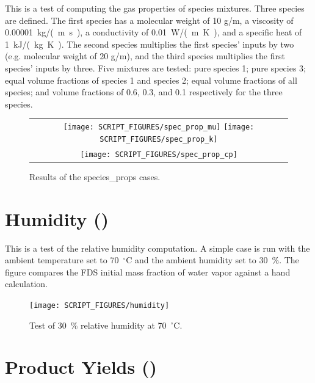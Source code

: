 \documentclass[11pt]{book}
\begin{document}
This is a test of computing the gas properties of species mixtures. Three species are defined. The first species has a molecular weight of 10 g/m, a viscosity of 0.00001~\si{kg/(m.s)},
a conductivity of 0.01~\si{W/(m.K)}, and a specific heat of 1~\si{kJ/(kg.K)}. The second species multiplies the first species' inputs by two (e.g. molecular weight of 20 g/m), and the third species multiplies the first species' inputs by three. Five mixtures are tested: pure species 1; pure species 3; equal volume fractions of species 1 and species 2; equal volume fractions of all species; and volume fractions of 0.6, 0.3, and 0.1 respectively for the three species.

\begin{figure}[ht]
    \centering
    \begin{tabular}{c}
      \texttt{[image: SCRIPT\_FIGURES/spec\_prop\_mu]}
      \texttt{[image: SCRIPT\_FIGURES/spec\_prop\_k]} \\
      \texttt{[image: SCRIPT\_FIGURES/spec\_prop\_cp]}
   \end{tabular}
   \caption[Results of the {\ct species\_props} cases]{Results of the {\ct species\_props} cases.}
   \label{fig_species_props}
\end{figure}

\section{Humidity (\texorpdfstring{}{humidity})}
\label{humidity}

This is a test of the relative humidity computation. A simple case is run with the ambient temperature set to 70~$^{\circ}$C and the ambient humidity set to 30~\%. The figure compares  the FDS initial mass fraction of water vapor against a hand calculation.

\begin{figure}[ht]
    \centering
    \texttt{[image: SCRIPT\_FIGURES/humidity]}
    \caption[Test of 30~\% relative humidity at 70~$^{\circ}$C]{Test of 30~\% relative humidity at 70~$^{\circ}$C. }
    \label{fig_humidity}
\end{figure}

\section{Product Yields (\texorpdfstring{}{methane\_flame})}
\label{methane_flame}
\end{document}
